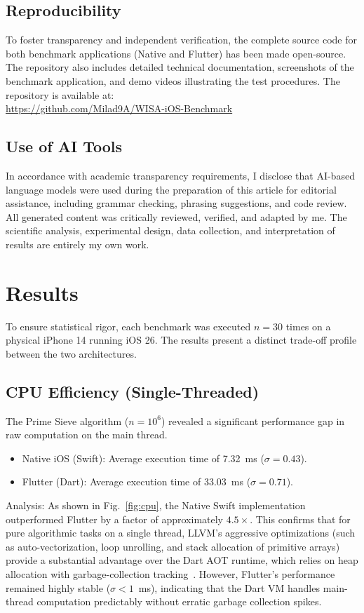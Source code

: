 \documentclass[journal]{IEEEtran}
\begin{document}
\subsection{Reproducibility}
To foster transparency and independent verification, the complete source code for both benchmark
applications (Native and Flutter) has been made open-source. The repository also includes detailed technical documentation, screenshots of the benchmark application, and demo videos illustrating the test procedures. The repository is available at:
\\
\url{https://github.com/Milad9A/WISA-iOS-Benchmark}

\subsection{Use of AI Tools}
In accordance with academic transparency requirements, I disclose that AI-based language models were used during the preparation of this article for editorial assistance, including grammar checking, phrasing suggestions, and code review. All generated content was critically reviewed, verified, and adapted by me. The scientific analysis, experimental design, data collection, and interpretation of results are entirely my own work.

\section{Results}
To ensure statistical rigor, each benchmark was executed $n = 30$ times on a physical iPhone 14 running iOS
26. The results present a distinct trade-off profile between the two architectures.

\subsection{CPU Efficiency (Single-Threaded)}
The Prime Sieve algorithm ($n = 10^6$) revealed a significant performance gap in raw computation on the main
thread.

\begin{itemize}
	\item Native iOS (Swift): Average execution time of 7.32~ms ($\sigma = 0.43$).
	\item Flutter (Dart): Average execution time of 33.03~ms ($\sigma = 0.71$).
\end{itemize}

Analysis: As shown in Fig.~\ref{fig:cpu}, the Native Swift implementation outperformed Flutter by a
factor of approximately $4.5\times$. This confirms that for pure algorithmic tasks on a single thread, LLVM's
aggressive optimizations (such as auto-vectorization, loop unrolling, and stack allocation of primitive arrays) provide a substantial
advantage over the Dart AOT runtime, which relies on heap allocation with garbage-collection tracking~\cite{nawrocki2021}. However, Flutter's performance remained highly stable
($\sigma < 1$~ms), indicating that the Dart VM handles main-thread computation predictably without erratic
garbage collection spikes.
\end{document}
